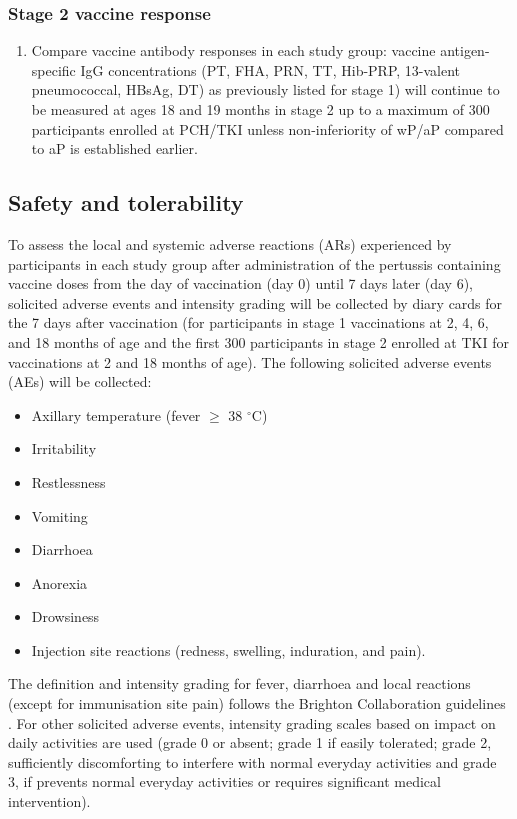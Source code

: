 \documentclass{bmcart}
\begin{document}
\subsubsection*{Stage 2 vaccine response}

\begin{enumerate}[resume]
	\item Compare vaccine antibody responses in each study group:
	vaccine antigen-specific IgG concentrations (PT, FHA, PRN, TT, Hib-PRP, 13-valent pneumococcal, HBsAg, DT) 
	as previously listed for stage 1) will continue to be measured at ages 18 and 19 months in stage 2 up to a 
	maximum of 300 participants enrolled at PCH/TKI unless non-inferiority of wP/aP compared to aP is established earlier.
\end{enumerate}

\subsection*{Safety and tolerability}

To assess the local and systemic adverse reactions (ARs) experienced by participants in each study group after administration of the pertussis containing vaccine doses from the day of vaccination (day 0) until 7 days later (day 6), solicited adverse events and intensity grading will be collected by diary cards for the 7 days after vaccination (for participants in stage 1 vaccinations at 2, 4, 6, and 18 months of age and the first 300 participants in stage 2 enrolled at TKI for vaccinations at 2 and 18 months of age). The following solicited adverse events (AEs) will be collected:
 \begin{itemize}
     \item Axillary temperature (fever $\geq$ 38 $^\circ$C)
     \item Irritability
     \item Restlessness
     \item Vomiting
     \item Diarrhoea
     \item Anorexia
     \item Drowsiness
     \item Injection site reactions (redness, swelling, induration, and pain).
 \end{itemize}
 The definition and intensity grading for fever, diarrhoea and  local  reactions  (except  for  immunisation  site  pain)  follows  the  Brighton  Collaboration  guidelines \cite{Marcy2004, Gidudu2011, Gidudu2008, Kohl2007a, Kohl2007b}. 
 For other solicited adverse events, intensity grading scales based on impact on daily activities are used  (grade 0 or absent; grade 1 if easily tolerated; grade 2, sufficiently discomforting to interfere with normal everyday activities and grade 3, if prevents normal everyday activities or requires significant medical intervention).
\end{document}
